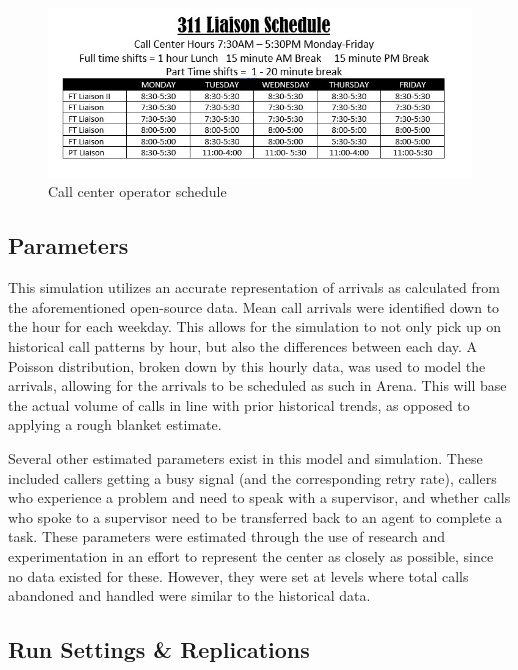 \documentclass[12pt]{article}
\begin{document}
	\begin{figure}[h]
		\includegraphics[scale=.3]{schedule2.jpg}
		\caption{Call center operator schedule}
	\end{figure}
	
	\subsection{Parameters}
	
	
	This simulation utilizes an accurate representation of arrivals as calculated from the aforementioned open-source data.  Mean call arrivals were identified down to the hour for each weekday.  This allows for the simulation to not only pick up on historical call patterns by hour, but also the differences between each day.  A Poisson distribution, broken down by this hourly data, was used to model the arrivals, allowing for the arrivals to be scheduled as such in Arena.  This will base the actual volume of calls in line with prior historical trends, as opposed to applying a rough blanket estimate.
	
	\par
	
	Several other estimated parameters exist in this model and simulation.  These included callers getting a busy signal (and the corresponding retry rate), callers who experience a problem and need to speak with a supervisor, and whether calls who spoke to a supervisor need to be transferred back to an agent to complete a task.  These parameters were estimated through the use of research and experimentation in an effort to represent the center as closely as possible, since no data existed for these.  However, they were set at levels where total calls abandoned and handled were similar to the historical data.
	
	\subsection{Run Settings \& Replications}
	
\end{document}

